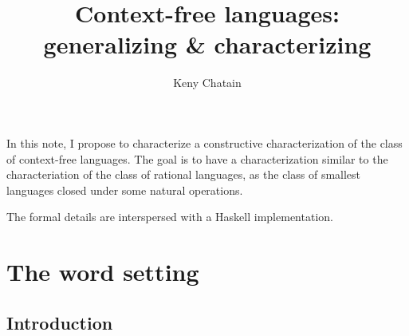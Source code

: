 

\endofdump

\title{Context-free languages: generalizing \& characterizing}
\author{Keny Chatain}


\maketitle

In this note, I propose to characterize a constructive characterization of the class of context-free languages. The goal is to have a characterization similar to the characteriation of the class of rational languages, as the class of smallest languages closed under some natural operations.

The formal details are interspersed with a Haskell implementation.

\section{The word setting}

\subsection{Introduction}

